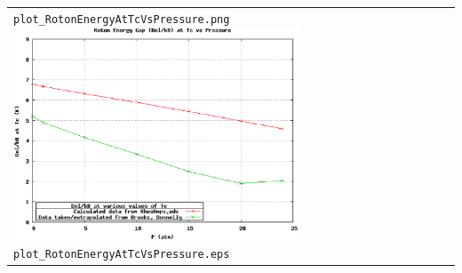 \documentclass[11pt]{article}
\begin{document}
\begin{center}
\begin{tabular}[\textwidth]{p{8.5cm}p{8.5cm}}
  \verb|plot_RotonEnergyAtTcVsPressure.png|
\else
  \includegraphics*[width=8.5cm]{plot_RotonEnergyAtTcVsPressure.eps}\newline
  \verb|plot_RotonEnergyAtTcVsPressure.eps|
\fi
 \\
\end{tabular}
\end{center}
\end{document}
